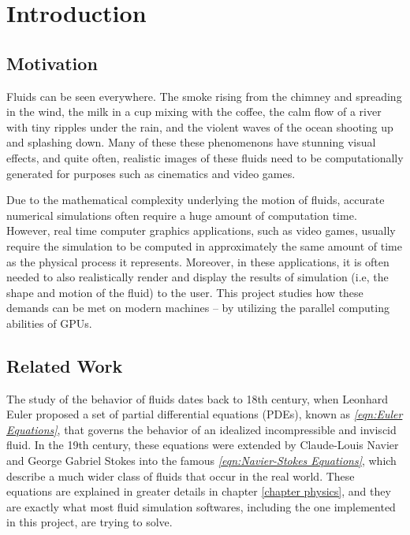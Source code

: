 \chapter{Introduction}

\section{Motivation}
Fluids can be seen everywhere. The smoke rising from the chimney and spreading in the wind, the milk in a cup mixing with the coffee, the calm flow of a river with tiny ripples under the rain, and the violent waves of the ocean shooting up and splashing down. Many of these these phenomenons have stunning visual effects, and quite often, realistic images of these fluids need to be computationally generated for purposes such as cinematics and video games. 


Due to the mathematical complexity underlying the motion of fluids, accurate numerical simulations often require a huge amount of computation time. However, real time computer graphics applications, such as video games, usually require the simulation to be computed in approximately the same amount of time as the physical process it represents. Moreover, in these applications, it is often needed to also realistically render and display the results of simulation (i.e, the shape and motion of the fluid) to the user. This project studies how these demands can be met on modern machines -- by utilizing the parallel computing abilities of GPUs.





\section{Related Work}



The study of the behavior of fluids dates back to 18th century, when Leonhard Euler proposed a set of partial differential equations (PDEs), known as \textit{\ref{eqn:Euler Equations}}, that governs the behavior of an idealized incompressible and inviscid fluid. In the 19th century, these equations were extended by Claude-Louis Navier and George Gabriel Stokes into the famous \textit{\ref{eqn:Navier-Stokes Equations}}, which describe a much wider class of fluids that occur in the real world. These equations are explained in greater details in chapter \ref{chapter physics}, and they are exactly what most fluid simulation softwares, including the one implemented in this project, are trying to solve. 

